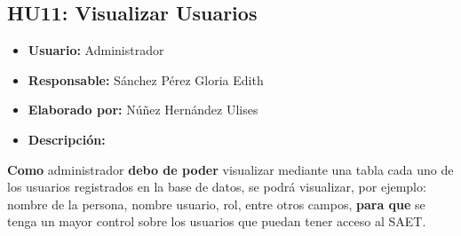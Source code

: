 \subsection{HU11: Visualizar Usuarios}
\begin{itemize}
	\item \textbf{Usuario:} Administrador
	\item \textbf{Responsable:} Sánchez Pérez Gloria Edith
	\item \textbf{Elaborado por:} Núñez Hernández Ulises
	\item \textbf{Descripción:}
\end{itemize}
\textbf{Como} administrador \textbf{debo de poder} visualizar mediante una tabla cada uno de los usuarios registrados en la base de datos, se podrá visualizar, por ejemplo: nombre de la persona, nombre usuario, rol, entre otros campos, \textbf{para que} se tenga un mayor control sobre los usuarios que puedan tener acceso al SAET.